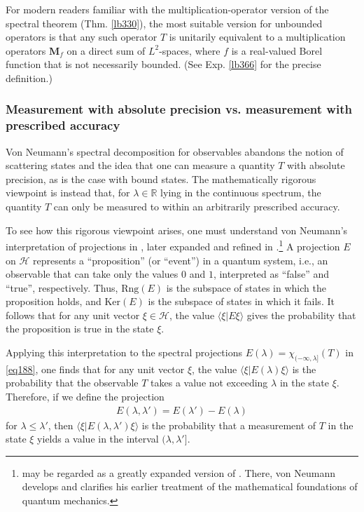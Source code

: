 \documentclass[12pt,b5paper,notitlepage]{article}
\theoremstyle{definition}
\theoremstyle{plain}
\newcommand{\bk}[1]{\langle {#1}\rangle}
\newcommand{\Rbb}{\mathbb R}
\newcommand{\Ker}{\mathrm{Ker}}
\newcommand{\Rng}{\mathrm{Rng}}
\newcommand{\MH}{\mathcal H}
\newcommand{\Mbf}{\mathbf M}
\numberwithin{equation}{section}
\begin{document}
For modern readers familiar with the multiplication-operator version of the spectral theorem (Thm. \ref{lb330}), the most suitable version for unbounded operators is that any such operator $T$ is unitarily equivalent to a multiplication operators $\Mbf_f$ on a direct sum of $L^2$-spaces, where $f$ is a real-valued Borel function that is not necessarily bounded. (See Exp. \ref{lb366} for the precise definition.)


\subsubsection{Measurement with absolute precision vs. measurement with prescribed accuracy}\label{lb427}



Von Neumann's spectral decomposition for observables abandons the notion of scattering states and the idea that one can measure a quantity $T$ with absolute precision, as is the case with bound states. The mathematically rigorous viewpoint is instead that, for $\lambda\in\Rbb$ lying in the continuous spectrum, the quantity $T$ can only be measured to within an arbitrarily prescribed accuracy. 

To see how this rigorous viewpoint arises, one must understand von Neumann's interpretation of projections in \cite{vN27}, later expanded and refined in \cite{vN32a}.\footnote{\cite{vN32a} may be regarded as a greatly expanded version of \cite{vN27}. There, von Neumann develops and clarifies his earlier treatment of the mathematical foundations of quantum mechanics.} A projection $E$ on $\MH$ represents a ``proposition'' (or ``event'') in a quantum system, i.e., an observable that can take only the values $0$ and $1$, interpreted as ``false'' and ``true'', respectively. Thus, $\Rng(E)$ is the subspace of states in which the proposition holds, and $\Ker(E)$ is the subspace of states in which it fails. It follows that for any unit vector $\xi\in \MH$, the value $\bk{\xi|E\xi}$ gives the probability that the proposition is true in the state $\xi$.

Applying this interpretation to the spectral projections $E(\lambda)=\chi_{(-\infty,\lambda]}(T)$ in \eqref{eq188}, one finds that for any unit vector $\xi$, the value $\bk{\xi|E(\lambda)\xi}$ is the probability that the observable $T$ takes a value not exceeding $\lambda$ in the state $\xi$. Therefore, if we define the projection
\begin{align*}
E(\lambda,\lambda')=E(\lambda')-E(\lambda)
\end{align*}
for $\lambda\leq\lambda'$, then $\bk{\xi|E(\lambda,\lambda')\xi}$ is the probability that a measurement of $T$ in the state $\xi$ yields a value in the interval $(\lambda,\lambda']$.
\end{document}
